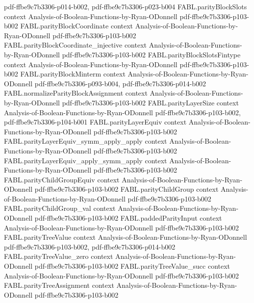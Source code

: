 \begin{theorem}
  {pdf-ffbe9c7b3306-p014-b002,
    pdf-ffbe9c7b3306-p023-b004}
\proofstep
  {FABL.parityBlockSlots}
  {context}
  {Analysis-of-Boolean-Functions-by-Ryan-ODonnell}
  {pdf-ffbe9c7b3306-p103-b002}
\proofstep
  {FABL.parityBlockCoordinate}
  {context}
  {Analysis-of-Boolean-Functions-by-Ryan-ODonnell}
  {pdf-ffbe9c7b3306-p103-b002}
\proofstep
  {FABL.parityBlockCoordinate_injective}
  {context}
  {Analysis-of-Boolean-Functions-by-Ryan-ODonnell}
  {pdf-ffbe9c7b3306-p103-b002}
\proofstep
  {FABL.parityBlockSlotsFintype}
  {context}
  {Analysis-of-Boolean-Functions-by-Ryan-ODonnell}
  {pdf-ffbe9c7b3306-p103-b002}
\proofstep
  {FABL.parityBlockMinterm}
  {context}
  {Analysis-of-Boolean-Functions-by-Ryan-ODonnell}
  {pdf-ffbe9c7b3306-p093-b004,
    pdf-ffbe9c7b3306-p014-b002}
\proofstep
  {FABL.normalizeParityBlockAssignment}
  {context}
  {Analysis-of-Boolean-Functions-by-Ryan-ODonnell}
  {pdf-ffbe9c7b3306-p103-b002}
\proofstep
  {FABL.parityLayerSize}
  {context}
  {Analysis-of-Boolean-Functions-by-Ryan-ODonnell}
  {pdf-ffbe9c7b3306-p103-b002,
    pdf-ffbe9c7b3306-p104-b001}
\proofstep
  {FABL.parityLayerEquiv}
  {context}
  {Analysis-of-Boolean-Functions-by-Ryan-ODonnell}
  {pdf-ffbe9c7b3306-p103-b002}
\proofstep
  {FABL.parityLayerEquiv_symm_apply_apply}
  {context}
  {Analysis-of-Boolean-Functions-by-Ryan-ODonnell}
  {pdf-ffbe9c7b3306-p103-b002}
\proofstep
  {FABL.parityLayerEquiv_apply_symm_apply}
  {context}
  {Analysis-of-Boolean-Functions-by-Ryan-ODonnell}
  {pdf-ffbe9c7b3306-p103-b002}
\proofstep
  {FABL.parityChildGroupEquiv}
  {context}
  {Analysis-of-Boolean-Functions-by-Ryan-ODonnell}
  {pdf-ffbe9c7b3306-p103-b002}
\proofstep
  {FABL.parityChildGroup}
  {context}
  {Analysis-of-Boolean-Functions-by-Ryan-ODonnell}
  {pdf-ffbe9c7b3306-p103-b002}
\proofstep
  {FABL.parityChildGroup_val}
  {context}
  {Analysis-of-Boolean-Functions-by-Ryan-ODonnell}
  {pdf-ffbe9c7b3306-p103-b002}
\proofstep
  {FABL.paddedParityInput}
  {context}
  {Analysis-of-Boolean-Functions-by-Ryan-ODonnell}
  {pdf-ffbe9c7b3306-p103-b002}
\proofstep
  {FABL.parityTreeValue}
  {context}
  {Analysis-of-Boolean-Functions-by-Ryan-ODonnell}
  {pdf-ffbe9c7b3306-p103-b002,
    pdf-ffbe9c7b3306-p014-b002}
\proofstep
  {FABL.parityTreeValue_zero}
  {context}
  {Analysis-of-Boolean-Functions-by-Ryan-ODonnell}
  {pdf-ffbe9c7b3306-p103-b002}
\proofstep
  {FABL.parityTreeValue_succ}
  {context}
  {Analysis-of-Boolean-Functions-by-Ryan-ODonnell}
  {pdf-ffbe9c7b3306-p103-b002}
\proofstep
  {FABL.parityTreeAssignment}
  {context}
  {Analysis-of-Boolean-Functions-by-Ryan-ODonnell}
  {pdf-ffbe9c7b3306-p103-b002}

\end{theorem}

